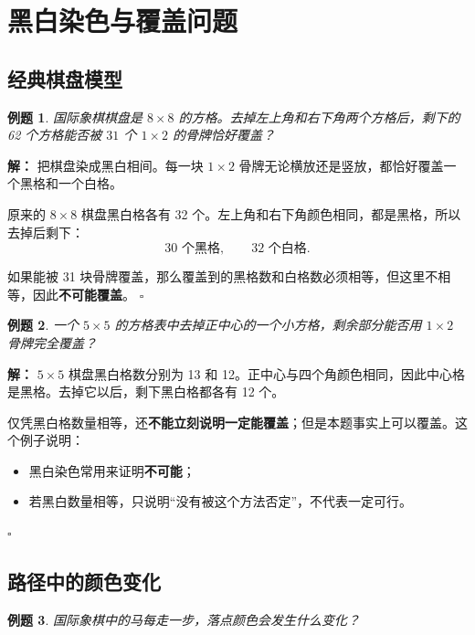 \documentclass[11pt,a4paper,fontset=fandol]{ctexart}
\theoremstyle{formaltheorem}
\theoremstyle{formalexample}
\newtheorem{example}{例题}[section]
\newenvironment{solution}{\par\noindent\textbf{解：}}{\hfill$\square$\par}
\begin{document}
\section{黑白染色与覆盖问题}

\subsection{经典棋盘模型}
\begin{example}
国际象棋棋盘是 $8\times 8$ 的方格。去掉左上角和右下角两个方格后，剩下的 62 个方格能否被 $31$ 个 $1\times 2$ 的骨牌恰好覆盖？
\end{example}

\begin{solution}
把棋盘染成黑白相间。每一块 $1\times 2$ 骨牌无论横放还是竖放，都恰好覆盖一个黑格和一个白格。

原来的 $8\times 8$ 棋盘黑白格各有 32 个。左上角和右下角颜色相同，都是黑格，所以去掉后剩下：
\[
30\text{ 个黑格},\qquad 32\text{ 个白格}.
\]

如果能被 31 块骨牌覆盖，那么覆盖到的黑格数和白格数必须相等，但这里不相等，因此\textbf{不可能覆盖}。
\end{solution}

\begin{example}
一个 $5\times 5$ 的方格表中去掉正中心的一个小方格，剩余部分能否用 $1\times 2$ 骨牌完全覆盖？
\end{example}

\begin{solution}
$5\times 5$ 棋盘黑白格数分别为 13 和 12。正中心与四个角颜色相同，因此中心格是黑格。去掉它以后，剩下黑白格都各有 12 个。

仅凭黑白格数量相等，还\textbf{不能立刻说明一定能覆盖}；但是本题事实上可以覆盖。这个例子说明：
\begin{itemize}
  \item 黑白染色常用来证明\textbf{不可能}；
  \item 若黑白数量相等，只说明“没有被这个方法否定”，不代表一定可行。
\end{itemize}
\end{solution}

\subsection{路径中的颜色变化}
\begin{example}
国际象棋中的马每走一步，落点颜色会发生什么变化？
\end{example}
\end{document}

